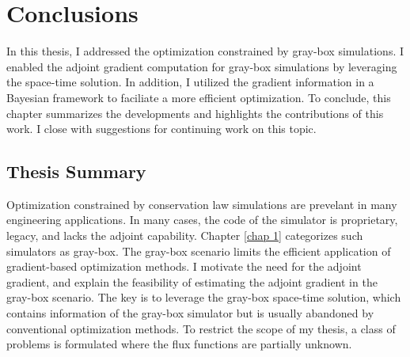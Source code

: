 \chapter{Conclusions}
\label{chapter 4}
In this thesis, I addressed the optimization constrained by gray-box simulations.
I enabled the adjoint gradient computation for gray-box simulations by leveraging the
space-time solution. In addition, I utilized the gradient information in a Bayesian
framework to faciliate a more efficient optimization. 
To conclude, this chapter summarizes the developments and highlights
the contributions of this work. I close with suggestions for continuing work
on this topic.


\section{Thesis Summary}
Optimization constrained by conservation law simulations are prevelant in many engineering
applications.
In many cases, the code of the simulator is proprietary, legacy, and
lacks the adjoint capability. 
Chapter \ref{chap 1} categorizes such simulators as gray-box.
The gray-box scenario limits the efficient application 
of gradient-based optimization methods.
I motivate the need for the
adjoint gradient, and explain the feasibility
of estimating the adjoint gradient in the gray-box scenario.
The key is to leverage the gray-box space-time solution, which contains information
of the gray-box simulator but is usually abandoned by conventional optimization methods.
To restrict the scope of my thesis, a class of problems is formulated where the
flux functions are partially unknown.\\


